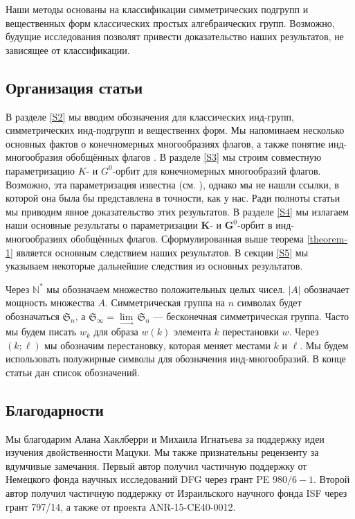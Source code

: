 \documentclass{amsart}
\theoremstyle{definition}
\newcommand{\NN}{\mathbb{N}^*}
\begin{document}
Наши методы основаны на классификации симметрических подгрупп и вещественных форм классических простых алгебраических групп. Возможно, будущие исследования позволят привести доказательство наших результатов, не зависящее от классификации.

\subsection*{Организация статьи}

В разделе \ref{S2} мы вводим обозначения для классических инд-групп, симметрических инд-подгрупп и вещественнх форм.
Мы напоминаем несколько основных фактов о конечномерных многообразиях  флагов, а также понятие инд-многообразия обобщённых флагов \cite{Dimitrov-Penkov,Ignatyev-Penkov}.
В разделе \ref{S3} мы строим
совместную параметризацию  $K$- и $G^0$-орбит для конечномерных многообразий  флагов.
Возможно, эта параметризация  известна (см. \cite{MO,Y}),
однако мы не нашли ссылки, в которой она была бы представлена в точности, как у нас. Ради полноты статьи мы приводим явное доказательство этих результатов.
В разделе \ref{S4} мы излагаем наши основные результаты о параметризации $\mathbf{K}$- и $\mathbf{G}^0$-орбит в инд-многообразиях обобщённых флагов. Сформулированная выше теорема \ref{theorem-1}  является основным следствием наших результатов.
В секции \ref{S5} мы указываем некоторые дальнейшие следствия из  основных результатов.

Через $\NN$ мы обозначаем множество положительных целых чисел.
$|A|$  обозначает мощность множества $A$.  Симметрическая группа на $n$ символах будет обозначаться $\mathfrak{S}_n$, а $\mathfrak{S}_\infty=\lim\limits_{\longrightarrow}\,\mathfrak{S}_n$ ---  бесконечная симметрическая группа.
Часто мы будем писать $w_k$ для образа $w(k)$ элемента $k$ перестановки $w$.
Через $(k;\ell)$ мы обозначим перестановку, которая меняет местами $k$ и $\ell$.
Мы будем использовать полужирные символы для обозначения инд-многообразий.
В конце статьи дан список обозначений.

\subsection*{Благодарности}


Мы благодарим Алана Хаклберри и Михаила Игнатьева за поддержку идеи изучения двойственности Мацуки.  Мы также признательны рецензенту за вдумчивые замечания. Первый автор получил частичную поддержку от Немецкого фонда научных исследований DFG через грант PE $980/6-1$. Второй автор получил частичную поддержку от Израильского научного фонда ISF через грант 797/14, а также от проекта ANR-15-CE40-0012. 
\end{document}

